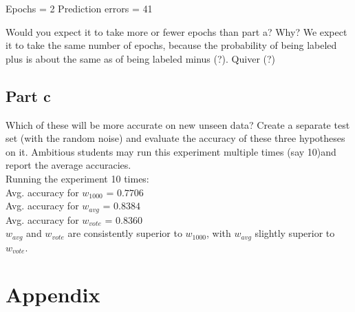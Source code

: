 \documentclass{article}
\begin{document}
Epochs = 2
Prediction errors = 41

Would you expect it to take more or fewer epochs than part a? Why?
We expect it to take the same number of epochs, because the probability of being labeled plus is about the same as of being labeled minus (?). Quiver (?)


\subsection*{Part c}

Which of these will be more accurate on new unseen data? Create a separate test set (with the random noise) and evaluate the accuracy of these three hypotheses on it. Ambitious students may run this experiment multiple times (say 10)and report the average accuracies.
\\
Running the experiment 10 times: \\
Avg. accuracy for $w_{1000}$ = $0.7706$ \\
Avg. accuracy for $w_{avg}$ = $0.8384$ \\
Avg. accuracy for $w_{vote}$ = $0.8360$ \\

\noindent $w_{avg}$ and $w_{vote}$ are consistently superior to $w_{1000}$, with $w_{avg}$ slightly superior to $w_{vote}$.

\section{Appendix}

\begin{tiny}



\end{tiny}
\end{document}
